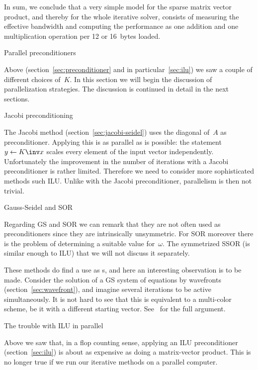In sum, we conclude that a very simple model for the sparse matrix vector product,
and thereby for the whole iterative solver, consists of measuring
the effective bandwidth and computing the performance as one
addition and one multiplication operation per 12 or 16~bytes loaded.

 {Parallel preconditioners}
\label{sec:parallel-prec}

Above (section~\ref{sec:preconditioner} and in particular~\ref{sec:ilu}) we saw a
couple of different choices of~$K$. In this section we will begin the
discussion of parallelization strategies. The discussion is continued
in detail in the next sections.

 {Jacobi preconditioning}

The Jacobi method (section~\ref{sec:jacobi-seidel}) uses the diagonal
of~$A$ as preconditioner. Applying this is as parallel as is
possible: the statement $y\leftarrow K\inv x$ scales every element of
the input vector independently. Unfortunately the improvement in the
number of iterations with a Jacobi preconditioner is rather
limited. Therefore we need to consider more sophisticated methods such
\ac{ILU}. Unlike with the Jacobi preconditioner, parallelism is then
not trivial.

 {Gauss-Seidel and SOR}

Regarding \ac{GS} and \ac{SOR} we can remark that they are not often used as
preconditioners since they are intrinsically unsymmetric.
For \ac{SOR} moreover there is the problem of determining a suitable
value for~$\omega$.
The symmetrized \ac{SSOR} (is similar enough to \ac{ILU}) that we
will not discuss it separately.

These methods do find a use as s,
and here an interesting observation is to be made.
Consider the solution of a \ac{GS} system of equations by wavefronts
(section~\ref{sec:wavefront}),
and imagine several iterations to be active simultaneously.
It is not hard to see that this is equivalent to a multi-color
scheme, be it with a different starting vector.
See~\cite{AdJo:colorblind} for the full argument.

 {The trouble with ILU in parallel}

Above we saw that, in a flop counting sense, applying an ILU
preconditioner (section~\ref{sec:ilu}) is about as expensive as doing
a matrix-vector product. This is no longer true if we run our
iterative methods on a parallel computer.

